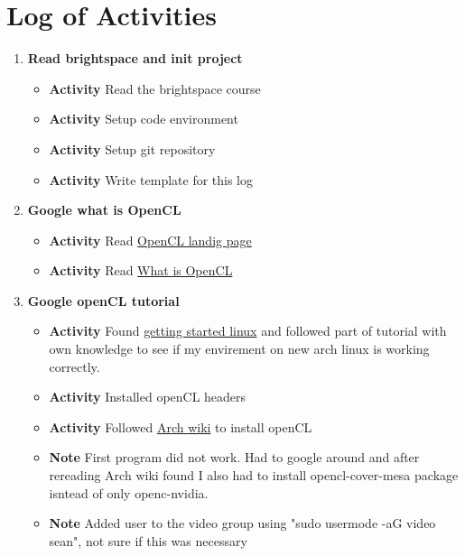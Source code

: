 \documentclass{article}
\begin{document}
\section*{Log of Activities}
\begin{enumerate}
    \item \textbf{Read brightspace and init project}
    \begin{itemize}
        \item \textbf{Activity} Read the brightspace course
        \item \textbf{Activity} Setup code environment
        \item \textbf{Activity} Setup git repository
        \item \textbf{Activity} Write template for this log
    \end{itemize}

    \item \textbf{Google what is OpenCL}
    \begin{itemize}
        \item \textbf{Activity} Read \href{https://www.khronos.org/api/index_2017/opencl/}{OpenCL landig page}
        \item \textbf{Activity} Read \href{https://medium.com/@bcrodrigues/what-is-opencl-14fbec353e09}{What is OpenCL}
    \end{itemize}

    \item \textbf{Google openCL tutorial}
    \begin{itemize}
        \item \textbf{Activity} Found \href{https://github.com/KhronosGroup/OpenCL-Guide/blob/main/chapters/getting_started_linux.md}{getting started linux} and followed part of tutorial with own knowledge to see if my envirement on new arch linux is working correctly.
        \item \textbf{Activity} Installed openCL headers
        \item \textbf{Activity} Followed \href{https://wiki.archlinux.org/title/GPGPU#OpenCL}{Arch wiki} to install openCL
        \item \textbf{Note} First program did not work. Had to google around and after rereading Arch wiki found I also had to install opencl-cover-mesa package isntead of only openc-nvidia.
        \item \textbf{Note} Added user to the video group using "sudo usermode -aG video sean", not sure if this was necessary
    \end{itemize}


\end{enumerate}
\end{document}
